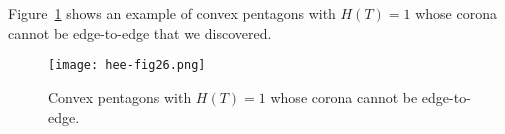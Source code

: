 \documentclass[11pt, a4paper]{article}
\begin{document}
\appendix
\def\thesection{Appendix }
\section{}

Figure~\ref{fig26} shows an example of convex pentagons with $H(T) = 1$ whose corona 
cannot be edge-to-edge that we discovered.









\renewcommand{\figurename}{{\small Figure.}}
\begin{figure}[htbp]
 \centering\texttt{[image: hee-fig26.png]} 
  \caption{{\small 
Convex pentagons with $H(T) = 1$ whose corona cannot be 
edge-to-edge.
} 
\label{fig26}
}
\end{figure}
\end{document}

